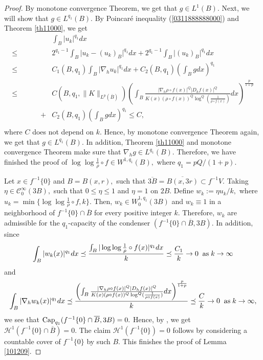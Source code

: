 \documentclass[11pt,twoside]{article}
\theoremstyle{definition}
\theoremstyle{remark}
\begin{document}
\begin{proof}
 By monotone convergence Theorem, we get that $g\in L^{1}(B).$ Next, we will show that $g\in  L^{q_{1}}(B).$ By Poincar\'{e} inequality   (\ref{0311888888000})  and Theorem \ref{th11000}, we get 
\begin{equation}
\begin{aligned}
&\int_{B}\vert u_{k}\vert^{q_{1}}dx\\
\leq& 2^{q_{1}-1}\int_{B}\vert u_{k}-(u_{k})_{B}\vert^{q_{1}}dx+2^{q_{1}-1}\int_{B}\vert(u_{k})_{B}\vert^{q_{1}}dx\\
\leq& C_{1}(B,q_{1})\int_{B}\vert \nabla_{h}u_{k}\vert^{q_{1}}dx+C_{2}(B,q_{1})\left(\int_{B} g dx\right)^{q_{1}}\\
\leq& C(B,q_{1},\|K\|_{L^{p}(\overline{B})})\left(\int_{B}\frac{\vert\nabla_{h}\rho\circ f(x)\vert^{Q}\vert D_{h}f(x)\vert^{Q}}{K(x)(\rho\circ f(x))^{Q}\log^{Q}(\frac{1}{\rho\circ f(x)})}dx\right)^{\frac{p}{1+p}}\\
\,\,\,\,\,\,\,\,\,\,\,\,\,\,\,\,\,\,\,\,\,\,\,\,+&C_{2}(B,q_{1})\left(\int_{B} g dx\right)^{q_{1}}\leq C,\\
\end{aligned}
\end{equation}
where $C$ does not depend  on $k.$ Hence, by  monotone convergence Theorem again, we get that $g\in L^{q_{1}}(B).$ In addition, Theorem \ref{th11000} and monotone convergence Theorem  make sure that 
$\nabla_{h}g\in L^{q_{1}}(B).$ Therefore, we have finished the proof of $\log\log\frac{1}{\rho}\circ f\in W^{1,q_{1}}(B),$ where $q_{1}=pQ/(1+p).$

Let $x\in f^{-1}\{0\}$ and $B=B(x,r),$ such that  $\overline{3B}=\overline{B(x,3r)}\subset f^{-1}V.$ Taking $\eta\in \mathcal{C}_{0}^{\infty}(3B),$ such that $0\leq\eta\leq1$ and $\eta=1$ on $2B.$
Define $w_{k}:=\eta u_{k}/k,$ where $u_{k}=\min\{\log\log\frac{1}{\rho}\circ f,k\}.$ Then, $w_{k}\in W_{0}^{1,q_{1}}(3B)$ and $w_{k}\equiv1$ in a neighborhood of $f^{-1}\{0\}\cap \overline{B}$ for every positive integer $k.$ Therefore, $w_{k}$ are admissible for the $q_{1}$-capacity of the condenser
$(f^{-1}\{0\}\cap \overline{B},3B).$ In addition, since
$$\int_{B}\vert w_{k}(x)\vert^{q_{1}}dx\preceq \frac{\int_{B}\vert\log\log\frac{1}{\rho}\circ f(x)\vert^{q_{1}}dx}{k}\preceq\frac{C_{1}}{k}\rightarrow0\;\;{\rm as}\;k\rightarrow\infty$$
and 
$$\int_{B}\vert \nabla_{h}w_{k}(x)\vert^{q_{1}}dx\preceq \frac{\left(\int_{B}\frac{\vert\nabla_{h}\rho\circ f(x)\vert^{Q}\vert D_{h}f(x)\vert^{Q}}{K(x)(\rho\circ f(x))^{Q}\log^{Q}(\frac{1}{\rho\circ f(x)})}dx\right)^{\frac{p}{1+p}}}{k}\preceq \frac{C}{k}\rightarrow0\;\;{\rm as}\;k\rightarrow\infty,$$
we see that ${\rm Cap}_{q_{1}}(f^{-1}\{0\}\cap \overline{B},3B)=0.$ Hence, by \cite[Theorem 9]{VK09}, we get $\mathcal{H}^{1}(f^{-1}\{0\}\cap \overline{B})=0.$ The claim $\mathcal{H}^{1}(f^{-1}\{0\})=0$
 follows by considering a countable cover of $f^{-1}\{0\}$ by such $B.$ This finishes the  proof of Lemma \ref{101209}.
\end{proof}
 
\end{document}

